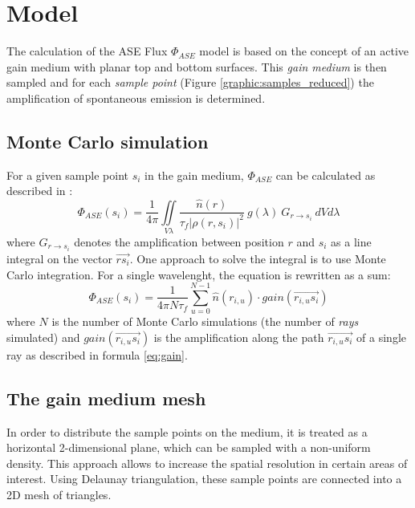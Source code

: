 \section{Model}

The calculation of the ASE Flux $\Phi_{ASE}$ model is based on the concept of an
active gain medium with planar top and bottom surfaces. This \emph{gain medium} is
then sampled and for each \emph{sample point} (Figure
\ref{graphic:samples_reduced}) the amplification of spontaneous emission is
determined. 


\subsection{Monte Carlo simulation}
\label{subsec:monteCarlo}

For a given sample point $s_i$ in the gain medium, $\Phi_{ASE}$ can
be calculated as described in \cite{ASE2010}:
\begin{equation}
  \label{eq:phi_ase_daniel} 
  \Phi_{ASE}(s_i)=\frac{1}{4\pi}\iint\limits_{V \lambda}
  \frac
    {\hat{n}(r)}
    {\tau_{f}|\rho(r,s_i)|^2}
  ~g(\lambda)
  ~G_{r\rightarrow s_i}
  ~dV d\lambda
\end{equation}
where $G_{r\rightarrow s_i}$ denotes the amplification between
position $r$ and $s_i$ as a line integral on the vector
$\overrightarrow{rs_i}$.  One approach to solve the integral is to use Monte
Carlo integration. For a single wavelenght, the equation is rewritten as a sum:
\begin{equation}
  \label{eq:monte_carlo_ase}
  \Phi_{ASE}(s_i) = 
  \frac{1}{4\pi N\tau_f}
  \sum^{N-1}_{u=0} \hat{n}(r_{i,u}) \cdot gain(\overrightarrow{r_{i,u}s_i})
\end{equation}
where $N$ is the number of Monte Carlo simulations (the number of \emph{rays}
simulated) and $gain(\overrightarrow{r_{i,u}s_i})$ is the amplification along the
path $\overrightarrow{r_{i,u}s_i}$ of a single ray as described in formula
\eqref{eq:gain}.


\subsection{The gain medium mesh} \label{subsec:meshSampling}

In order to distribute the sample points on the medium, it is treated as
a horizontal 2-dimensional plane, which can be sampled with a non-uniform
density. This approach allows to increase the spatial resolution in certain
areas of interest. Using Delaunay triangulation, these sample points are
connected into a 2D mesh of triangles.

